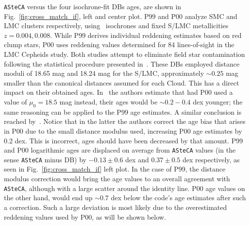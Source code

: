 \documentclass[draft]{aa}
\begin{document}
%
%
\texttt{ASteCA} versus the four isochrone-fit DBs ages, are shown in
Fig.~\ref{fig:cross_match_if}, left and center plot.
%
P99 and P00 analyze SMC and LMC clusters respectively,
using~\cite{Bertelli_1994} isochrones and fixed S/LMC metallicities
$z{=}0.004, 0.008$. While P99 derives individual reddening estimates based on
red clump stars, P00 uses reddening values determined for 84 lines-of-sight
in the~\cite{Udalski_1999} LMC Cepheids study.
%
Both studies attempt to eliminate field star contamination following the
statistical procedure presented in~\cite{Mateo_1986}.
These DBs employed distance moduli of 18.65 mag and 18.24 mag for the S/LMC,
approximately ${\sim}0.25$ mag smaller than the canonical distances assumed for
each Cloud. This has a direct impact on their obtained ages.
%
In~\cite{de_Grijs_2006} the authors estimate that had P00 used a value
of $\mu_0{=}18.5$ mag instead, their ages would be ${\sim}0.2{-}0.4$
dex younger; the same reasoning can be applied to the P99 age estimates.
A similar conclusion is reached by~\cite{Baumgardt_2013}.
Notice that in the latter the authors correct the age bias that
arises in P00 due to the small distance modulus used, increasing P00 age
estimates by 0.2 dex. This is incorrect, ages should have been decreased by that
amount. 
%
P99 and P00 logarithmic ages are displaced on average from \texttt{ASteCA}
values (in the sense \texttt{ASteCA} minus DB) by $-0.13{\pm}0.6$ dex and $0.37
{\pm}0.5$ dex respectively, as seen in Fig.~\ref{fig:cross_match_if} left plot.
In the case of P99, the distance modulus correction would bring the age values
to an overall agreement with \texttt{ASteCA}, although with a large scatter
around the identity line.
%
P00 age values on the other hand, would end up ${\sim}0.7$ dex below the code's
age estimates after such a correction. Such a large deviation is most likely due
to the overestimated reddening values used by P00, as will be shown below.
\end{document}
